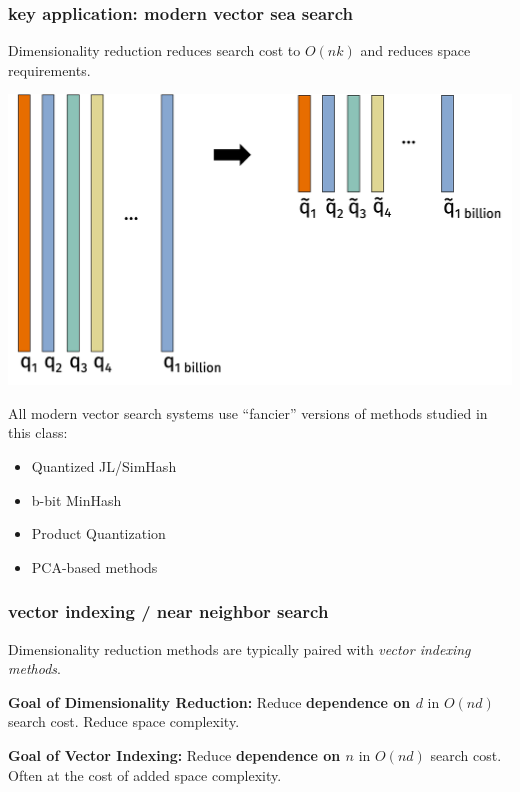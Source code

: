 \documentclass[compress]{beamer}
\begin{document}
\begin{frame}
	\frametitle{key application: modern vector sea search}
	Dimensionality reduction reduces search cost to $O(nk)$ and reduces space requirements.
	\begin{center}
		\vspace{-.5em}
				\includegraphics[width=.7\textwidth]{vector_search_recap2.png}
				\vspace{-.75em}
	\end{center}
	 All modern vector search systems use ``fancier'' versions of methods studied in this class:
	 \vspace{-.25em}
	 \begin{multicols}{2}
		\begin{itemize}
			\item Quantized JL/SimHash
			\item b-bit MinHash
			\item Product Quantization 
			\item PCA-based methods
		\end{itemize}
		\end{multicols}
\end{frame} 

\begin{frame}
	\frametitle{vector indexing / near neighbor search}
	Dimensionality reduction methods are typically paired with \emph{vector indexing methods}.

	\textbf{Goal of Dimensionality Reduction:} Reduce \alert{\textbf{dependence on $d$}} in $O(nd)$ search cost. Reduce space complexity. 

	\textbf{Goal of Vector Indexing:} Reduce \alert{\textbf{dependence on $n$}} in $O(nd)$ search cost. Often at the cost of added space complexity. 
\end{frame}
\end{document}
